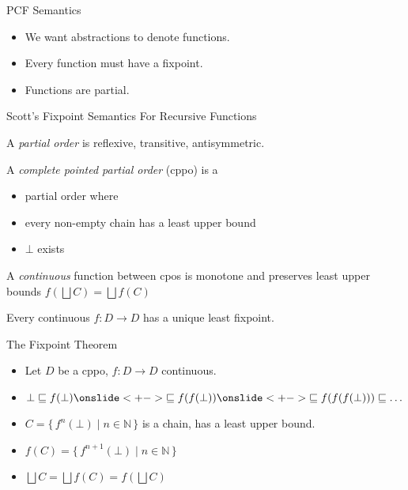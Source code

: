 \documentclass{beamer}
\newcommand{\below}{\sqsubseteq}
\newcommand{\set}[1]{\{\,#1\,\}}
\newcommand{\bbN}{\mathbb{N}}
\newcommand{\lub}{\bigsqcup}
\newcommand{\arr}{\rightarrow}
\begin{document}
\begin{frame}{PCF Semantics}
\begin{itemize}
\item We want abstractions to denote functions.
\item Every function must have a fixpoint.
\item Functions are partial.
\end{itemize}
\end{frame}

\begin{frame}{Scott's Fixpoint Semantics For Recursive Functions}

\begin{definition}
A \emph{partial order} is reflexive, transitive, antisymmetric.
\end{definition}

\begin{definition}
A \emph{complete pointed partial order} (cppo) is a
\begin{itemize}
\item partial order where
\item every non-empty chain has a least upper bound
\item $\bot$ exists
\end{itemize}
\end{definition}

\begin{definition}
A \emph{continuous} function between cpos is monotone and preserves least upper bounds $f(\lub C) = \lub f(C)$
\end{definition}

\begin{theorem}
Every continuous $f : D \arr D$ has a unique least fixpoint.
\end{theorem}

\end{frame}



\begin{frame}{The Fixpoint Theorem}

\begin{itemize} \itemsep0.5em
\onslide<+->
\item Let $D$ be a cppo, $f : D \arr D$ continuous.

\item $\bot \below f(\bot)
   \onslide<+->{ \below f(f(\bot))}
   \onslide<+->{\below f(f(f(\bot))) \below \ldots}$

\onslide<+->
\item $C = \set{f^n(\bot) \mid n \in \bbN}$ is a chain, has a least upper bound.

\onslide<+->
\item $f(C) = \set{f^{n+1}(\bot) \mid n \in \bbN}$

\onslide<+->
\item $\lub C = \lub f(C) = f(\lub C)$

\end{itemize}

\end{frame}
\end{document}
